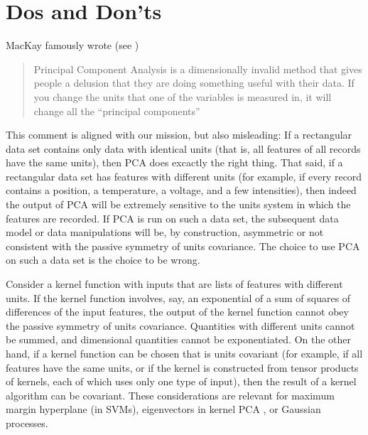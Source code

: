 \documentclass[preprint]{article} %
\begin{document}
\section{Dos and Don'ts}\label{sec:dos}
MacKay famously wrote (see \citealt{muldoonmedium})
\begin{quote}Principal Component Analysis is a dimensionally invalid method that gives people a delusion that they are doing something useful with their data. If you change the units that one of the variables is measured in, it will change all the ``principal components''\end{quote}
This comment is aligned with our mission, but also misleading: If a rectangular data set contains only data with identical units (that is, all features of all records have the same units), then PCA does excactly the right thing.
That said, if a rectangular data set has features with different units (for example, if every record contains a position, a temperature, a voltage, and a few intensities), then indeed the output of PCA will be extremely sensitive to the units system in which the features are recorded.
If PCA is run on such a data set, the subsequent data model or data manipulations will be, by construction, asymmetric or not consistent with the passive symmetry of units covariance.
The choice to use PCA on such a data set is the choice to be wrong.

Consider a kernel function with inputs that are lists of features with different units.
If the kernel function involves, say, an exponential of a sum of squares of differences of the input features, the output of the kernel function cannot obey the passive symmetry of units covariance.
Quantities with different units cannot be summed, and dimensional quantities cannot be exponentiated. 
On the other hand, if a kernel function can be chosen that is units covariant (for example, if all features have the same units, or if the kernel is constructed from tensor products of kernels, each of which uses only one type of input), then the result of a kernel algorithm can be covariant. These considerations are relevant for maximum margin hyperplane (in SVMs), eigenvectors in kernel PCA \citep{SchSmo02}, or Gaussian processes.
\end{document}
